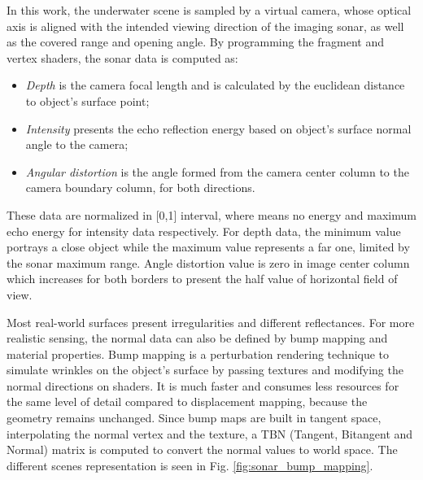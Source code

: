 \documentclass[final,5p,times]{elsarticle}
\begin{document}
In this work, the underwater scene is sampled by a virtual camera, whose optical axis is aligned with the intended viewing direction of the imaging sonar, as well as the covered range and opening angle. By programming the fragment and vertex shaders, the sonar data is computed as:

\begin{itemize}[(a)]
    \item \textit{Depth} is the camera focal length and is calculated by the euclidean distance to object's surface point;
    \item \textit{Intensity} presents the echo reflection energy based on object's surface normal angle to the camera;
    \item \textit{Angular distortion} is the angle formed from the camera center column to the camera boundary column, for both directions.
\end{itemize}

These data are normalized in [0,1] interval, where means no energy and maximum echo energy for intensity data respectively. For depth data, the minimum value portrays a close object while the maximum value represents a far one, limited by the sonar maximum range. Angle distortion value is zero in image center column which increases for both borders to present the half value of horizontal field of view.

Most real-world surfaces present irregularities and different reflectances. For more realistic sensing, the normal data can also be defined by bump mapping and material properties. Bump mapping is a perturbation rendering technique to simulate wrinkles on the object's surface by passing textures and modifying the normal directions on shaders. It is much faster and consumes less resources for the same level of detail compared to displacement mapping, because the geometry remains unchanged. Since bump maps are built in tangent space, interpolating the normal vertex and the texture, a TBN (Tangent, Bitangent and Normal) matrix is computed to convert the normal values to world space. The different scenes representation is seen in Fig. \ref{fig:sonar_bump_mapping}.
\end{document}
